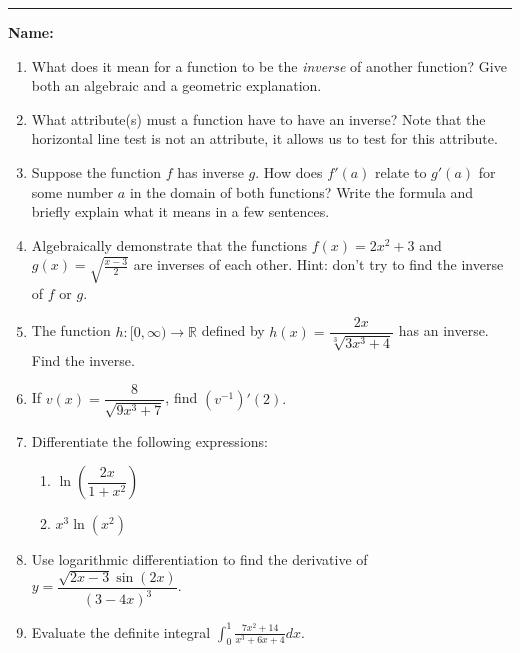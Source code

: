 \documentclass[11pt]{article}
\let\ds\displaystyle
\begin{document}
    \hrule
    \vspace{.5cm}
    \noindent\textbf{Name:} \underline{\qquad\qquad\qquad\qquad\qquad\qquad\qquad\qquad\qquad\qquad\qquad\qquad\qquad}

    \begin{enumerate}
        \item What does it mean for a function to be the \textit{inverse} of another function? Give both an algebraic and a geometric explanation.
        \vfill
        \item What attribute(s) must a function have to have an inverse? Note that the horizontal line test is not an attribute, it allows us to test for this attribute.
        \vfill
        \item Suppose the function $f$ has inverse $g$. How does $f'(a)$ relate to $g'(a)$ for some number $a$ in the domain of both functions? Write the formula and briefly explain what it means in a few sentences.
        \vfill
        \newpage
        \item Algebraically demonstrate that the functions $f(x)=2x^{2}+3$ and $g(x)=\ds\sqrt{\frac{x-3}{2}}$ are inverses of each other. Hint: don't try to find the inverse of $f$ or $g$.
        \vfill
        \item The function $h:[0,\infty)\to\mathbb{R}$ defined by $h(x)=\dfrac{2x}{\sqrt[3]{3x^{3}+4}}$ has an inverse. Find the inverse.
        \vfill
        \item If $v(x)=\dfrac{8}{\sqrt{9x^{3}+7}}$, find $(v^{-1})'(2).$
        \vfill
        \newpage
        \item Differentiate the following expressions:
        \begin{enumerate}
            \item $\ln\left(\dfrac{2x}{1+x^{2}}\right)$
            \vfill
            \item $x^{3}\ln(x^{2})$
            \vfill
        \end{enumerate}
        \item Use logarithmic differentiation to find the derivative of $y=\dfrac{\sqrt{2x-3}\sin(2x)}{(3-4x)^{3}}$.
        \vfill
        \newpage
        \item Evaluate the definite integral $\displaystyle\int_{0}^{1}\frac{7x^2+14}{x^{3}+6x+4}dx$.
    \end{enumerate}
\end{document}
